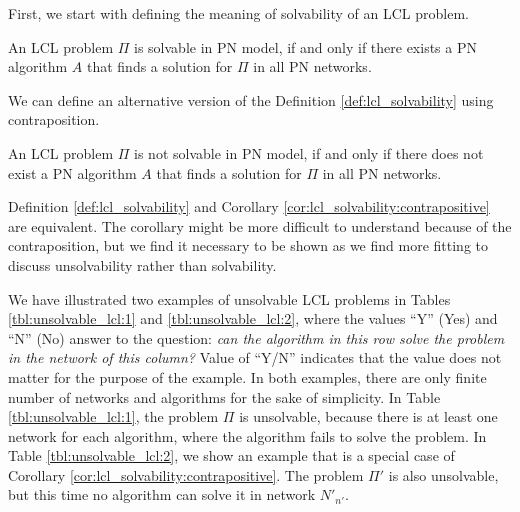First, we start with defining the meaning of solvability of an LCL problem.
\begin{definition} \label{def:lcl_solvability}
    An LCL problem $\Pi$ is solvable in PN model, if and only if there exists a PN algorithm $A$ that finds a solution for $\Pi$ in all PN networks.
\end{definition}

We can define an alternative version of the Definition \ref{def:lcl_solvability} using contraposition.
\begin{corollary} \label{cor:lcl_solvability:contrapositive}
An LCL problem $\Pi$ is not solvable in PN model, if and only if there does not exist a PN algorithm $A$ that finds a solution for $\Pi$ in all PN networks.
\end{corollary}

Definition \ref{def:lcl_solvability} and Corollary \ref{cor:lcl_solvability:contrapositive} are equivalent. The corollary might be more difficult to understand because of the contraposition, but we find it necessary to be shown as we find more fitting to discuss unsolvability rather than solvability.


We have illustrated two examples of unsolvable LCL problems in Tables \ref{tbl:unsolvable_lcl:1} and \ref{tbl:unsolvable_lcl:2}, where the values ``Y'' (Yes) and ``N'' (No) answer to the question: \emph{can the algorithm in this row solve the problem in the network of this column?}
Value of ``Y/N'' indicates that the value does not matter for the purpose of the example.
In both examples, there are only finite number of networks and algorithms for the sake of simplicity.
In Table \ref{tbl:unsolvable_lcl:1}, the problem $\Pi$ is unsolvable, because there is at least one network for each algorithm, where the algorithm fails to solve the problem.
In Table \ref{tbl:unsolvable_lcl:2}, we show an example that is a special case of Corollary \ref{cor:lcl_solvability:contrapositive}.
The problem $\Pi'$ is also unsolvable, but this time no algorithm can solve it in network $N'_{n'}$.

